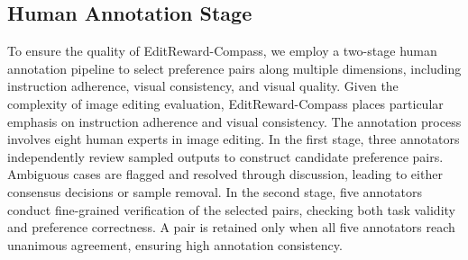 \documentclass{llmxive}
\providecommand{\rmbench}{EditReward-Compass}
\begin{document}
\subsection{Human Annotation Stage}
\label{Reward Model Benchmark Human Annotation}
To ensure the quality of {\rmbench}, we employ a two-stage human annotation pipeline to select preference pairs along multiple dimensions, including instruction adherence, visual consistency, and visual quality. Given the complexity of image editing evaluation, {\rmbench} places particular emphasis on instruction adherence and visual consistency. The annotation process involves eight human experts in image editing.
In the first stage, three annotators independently review sampled outputs to construct candidate preference pairs. Ambiguous cases are flagged and resolved through discussion, leading to either consensus decisions or sample removal. In the second stage, five annotators conduct fine-grained verification of the selected pairs, checking both task validity and preference correctness. A pair is retained only when all five annotators reach unanimous agreement, ensuring high annotation consistency.
\end{document}

